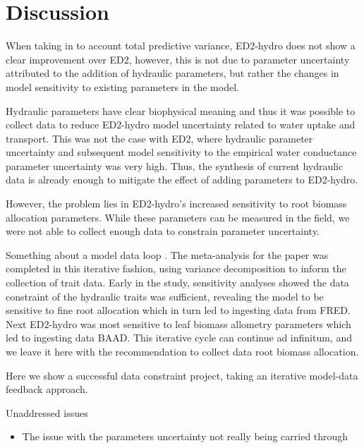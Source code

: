 \newpage
{}
\section*{Discussion}


When taking in to account total predictive variance, ED2-hydro does not show a clear improvement over ED2, however, this is not due to parameter uncertainty attributed to the addition of hydraulic parameters, but rather the changes in model sensitivity to existing parameters in the model. 

Hydraulic parameters have clear biophysical meaning and thus it was possible to collect data to reduce ED2-hydro model uncertainty related to water uptake and transport. This was not the case with ED2, where hydraulic parameter uncertainty and subsequent model sensitivity to the empirical water conductance parameter uncertainty was very high. Thus, the synthesis of current hydraulic data is already enough to mitigate the effect of adding parameters to ED2-hydro. 

However, the problem lies in ED2-hydro's increased sensitivity to root biomass allocation parameters. While these parameters can be measured in the field, we were not able to collect enough data to constrain parameter uncertainty. 

Something about a model data loop . 
The meta-analysis for the paper was completed in this iterative fashion, using variance decomposition to inform the collection of trait data. Early in the study, sensitivity analyses showed the data constraint of the hydraulic traits was sufficient, revealing the model to be sensitive to fine root allocation which in turn led to ingesting data from FRED. Next ED2-hydro was most sensitive to leaf biomass allometry parameters which led to ingesting data BAAD. This iterative cycle can continue ad infinitum, and we leave it here with the recommendation to collect data root biomass allocation. 

Here we show a successful data constraint project, taking an iterative model-data feedback approach. 


Unaddressed issues 
\begin{itemize}
    \item The issue with the parameters uncertainty not really being carried through
\end{itemize}